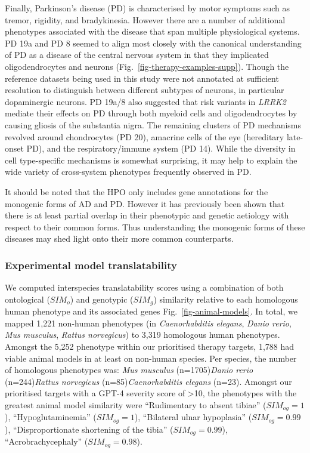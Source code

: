 \documentclass[
]{article}
\begin{document}
Finally, Parkinson's disease (PD) is characterised by motor symptoms
such as tremor, rigidity, and bradykinesia. However there are a number
of additional phenotypes associated with the disease that span multiple
physiological systems. PD 19a and PD 8 seemed to align most closely with
the canonical understanding of PD as a disease of the central nervous
system in that they implicated oligodendrocytes and neurons
(Fig.~\ref{fig-therapy-examples-supp}). Though the reference datasets
being used in this study were not annotated at sufficient resolution to
distinguish between different subtypes of neurons, in particular
dopaminergic neurons. PD 19a/8 also suggested that risk variants in
\emph{LRRK2} mediate their effects on PD through both myeloid cells and
oligodendrocytes by causing gliosis of the substantia nigra. The
remaining clusters of PD mechanisms revolved around chondrocytes (PD
20), amacrine cells of the eye (hereditary late-onset PD), and the
respiratory/immune system (PD 14). While the diversity in cell
type-specific mechanisms is somewhat surprising, it may help to explain
the wide variety of cross-system phenotypes frequently observed in PD.

It should be noted that the HPO only includes gene annotations for the
monogenic forms of AD and PD. However it has previously been shown that
there is at least partial overlap in their phenotypic and genetic
aetiology with respect to their common forms. Thus understanding the
monogenic forms of these diseases may shed light onto their more common
counterparts.

\subsubsection{Experimental model
translatability}\label{experimental-model-translatability}

We computed interspecies translatability scores using a combination of
both ontological (\(SIM_{o}\)) and genotypic (\(SIM_{g}\)) similarity
relative to each homologous human phenotype and its associated genes
Fig.~\ref{fig-animal-models}. In total, we mapped 1,221 non-human
phenotypes (in \emph{Caenorhabditis elegans}, \emph{Danio rerio},
\emph{Mus musculus}, \emph{Rattus norvegicus}) to 3,319 homologous human
phenotypes. Amongst the 5,252 phenotype within our prioritised therapy
targets, 1,788 had viable animal models in at least on non-human
species. Per species, the number of homologous phenotypes was: \emph{Mus
musculus} (n=1705)\emph{Danio rerio} (n=244)\emph{Rattus norvegicus}
(n=85)\emph{Caenorhabditis elegans} (n=23). Amongst our prioritised
targets with a GPT-4 severity score of \textgreater10, the phenotypes
with the greatest animal model similarity were ``Rudimentary to absent
tibiae'' (\(SIM_{og}=1\)), ``Hypoglutaminemia'' (\(SIM_{og}=1\)),
``Bilateral ulnar hypoplasia'' (\(SIM_{og}=0.99\)), ``Disproportionate
shortening of the tibia'' (\(SIM_{og}=0.99\)), ``Acrobrachycephaly''
(\(SIM_{og}=0.98\)).
\end{document}
